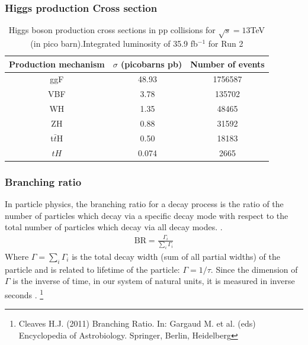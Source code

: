 \documentclass[11pt]{beamer}
\begin{document}
\begin{frame}
\frametitle{Higgs production Cross section}
\begin{table}
	\caption*{Higgs boson production cross sections  in pp collisions for $\sqrt{s}=13$TeV  (in
		pico barn).Integrated luminosity of 35.9 fb$^{-1}$ for Run 2\footnotemark}
	\begin{tabular}{|c|c|c|}
		\hline
		Production mechanism &
		$\sigma$ (picobarns pb)
		&Number of events \\
		\hline
		ggF &
		48.93 &
		1756587\\
		\hline
		VBF &
		3.78&
		135702\\
		\hline
		WH & 1.35 & 48465\\
		\hline
		ZH &0.88 & 31592\\
		\hline
		t$\bar{t}$H &
		0.50&
		18183\\
		\hline
		$tH$ &
		0.074&
		2665\\
		\hline
	\end{tabular}
\end{table}


\end{frame}



\begin{frame}
\frametitle{Branching ratio}
\small{In particle physics, the branching ratio for a decay process is the ratio of the number of particles which decay via a specific decay mode with respect to the total number of particles which decay via all decay modes. \footnotemark.}
\begin{align}
\text{BR} =\frac{\Gamma_i}{\sum_{i}\Gamma_i}
\end{align}
\small{Where $\Gamma=\sum_i\Gamma_i$ is the total decay width (sum of all partial widths) of the particle and is related to lifetime of the particle: $\Gamma=1/\tau$.
Since the dimension of $\Gamma$ is the inverse of time, in our system of natural units, it is measured in inverse seconds} .%
\footnote[0]{\tiny{Cleaves H.J. (2011) Branching Ratio. In: Gargaud M. et al. (eds) Encyclopedia of Astrobiology. Springer, Berlin, Heidelberg} }
\end{frame}
 
\end{document}

